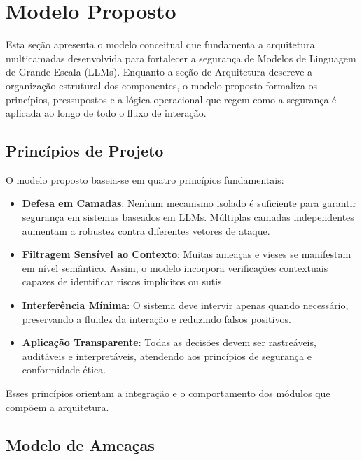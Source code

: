 \section{Modelo Proposto}
\label{sec:proposed_model}

Esta seção apresenta o modelo conceitual que fundamenta a arquitetura multicamadas desenvolvida para fortalecer a segurança de Modelos de Linguagem de Grande Escala (LLMs). Enquanto a seção de Arquitetura descreve a organização estrutural dos componentes, o modelo proposto formaliza os princípios, pressupostos e a lógica operacional que regem como a segurança é aplicada ao longo de todo o fluxo de interação.

\subsection{Princípios de Projeto}

O modelo proposto baseia-se em quatro princípios fundamentais:

\begin{itemize}
    \item \textbf{Defesa em Camadas}: Nenhum mecanismo isolado é suficiente para garantir segurança em sistemas baseados em LLMs. Múltiplas camadas independentes aumentam a robustez contra diferentes vetores de ataque.
    
    \item \textbf{Filtragem Sensível ao Contexto}: Muitas ameaças e vieses se manifestam em nível semântico. Assim, o modelo incorpora verificações contextuais capazes de identificar riscos implícitos ou sutis.
    
    \item \textbf{Interferência Mínima}: O sistema deve intervir apenas quando necessário, preservando a fluidez da interação e reduzindo falsos positivos.
    
    \item \textbf{Aplicação Transparente}: Todas as decisões devem ser rastreáveis, auditáveis e interpretáveis, atendendo aos princípios de segurança e conformidade ética.
\end{itemize}

Esses princípios orientam a integração e o comportamento dos módulos que compõem a arquitetura.

\subsection{Modelo de Ameaças}

